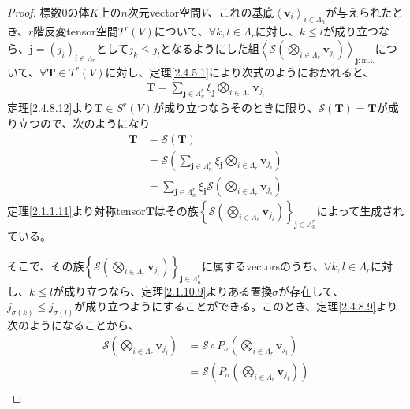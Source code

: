 \documentclass[dvipdfmx]{jsarticle}
\begin{document}
\begin{proof}
標数$0$の体$K$上の$n$次元vector空間$V$、これの基底$\left\langle \mathbf{v}_{i} \right\rangle_{i \in \varLambda_{n}}$が与えられたとき、$r$階反変tensor空間$T^{r}(V)$について、$\forall k,l \in \varLambda_{r}$に対し、$k \leq l$が成り立つなら、$\mathbf{j}=\left( j_{i} \right)_{i \in \varLambda_{r}}$として$j_{k} \leq j_{l}$となるようにした組$\left\langle \mathcal{S}\left( \bigotimes_{i \in \varLambda_{r}} \mathbf{v}_{j_{i}} \right) \right\rangle_{\mathbf{j}:\mathrm{m.i.} }$について、$\forall\mathbf{T} \in T^{r}(V)$に対し、定理\ref{2.4.5.1}により次式のようにおかれると、
\begin{align*}
\mathbf{T} = \sum_{\mathbf{j} \in \varLambda_{n}^{r}} {\xi_{\mathbf{j}}\bigotimes_{i \in \varLambda_{r}} \mathbf{v}_{j_{i}}}
\end{align*}
定理\ref{2.4.8.12}より$\mathbf{T} \in S^{r}(V)$が成り立つならそのときに限り、$\mathcal{S}\left( \mathbf{T} \right) = \mathbf{T}$が成り立つので、次のようになり
\begin{align*}
\mathbf{T} &= \mathcal{S}\left( \mathbf{T} \right)\\
&= \mathcal{S}\left( \sum_{\mathbf{j} \in \varLambda_{n}^{r}} {\xi_{\mathbf{j}}\bigotimes_{i \in \varLambda_{r}} \mathbf{v}_{j_{i}}} \right)\\
&= \sum_{\mathbf{j} \in \varLambda_{n}^{r}} {\xi_{\mathbf{j}}\mathcal{S}\left( \bigotimes_{i \in \varLambda_{r}} \mathbf{v}_{j_{i}} \right)}
\end{align*}
定理\ref{2.1.1.11}より対称tensor$\mathbf{T}$はその族$\left\{ \mathcal{S}\left( \bigotimes_{i \in \varLambda_{r}} \mathbf{v}_{j_{i}} \right) \right\}_{\mathbf{j} \in \varLambda_{n}^{r}}$によって生成されている。\par
そこで、その族$\left\{\mathcal{S}\left( \bigotimes_{i \in \varLambda_{r}} \mathbf{v}_{j_{i}} \right) \right\}_{\mathbf{j} \in \varLambda_{n}^{r}}$に属するvectorsのうち、$\forall k,l \in \varLambda_{r}$に対し、$k \leq l$が成り立つなら、定理\ref{2.1.10.9}よりある置換$\sigma$が存在して、$j_{\sigma(k)} \leq j_{\sigma(l)}$が成り立つようにすることができる。このとき、定理\ref{2.4.8.9}より次のようになることから、
\begin{align*}
\mathcal{S}\left( \bigotimes_{i \in \varLambda_{r}} \mathbf{v}_{j_{i}} \right) &= \mathcal{S}\circ P_{\sigma}\left( \bigotimes_{i \in \varLambda_{r}} \mathbf{v}_{j_{i}} \right)\\
&= \mathcal{S}\left( P_{\sigma}\left( \bigotimes_{i \in \varLambda_{r}} \mathbf{v}_{j_{i}} \right) \right)\\

\end{align*}
\end{proof}
\end{document}
